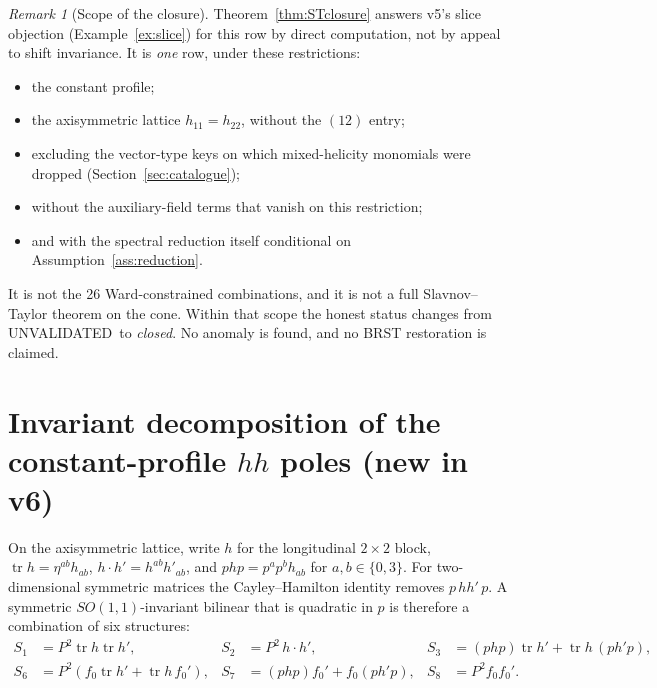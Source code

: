 \documentclass[11pt,a4paper]{article}
\newcommand{\UNVALIDATED}{\textsf{UNVALIDATED}}
\theoremstyle{plain}
\theoremstyle{definition}
\theoremstyle{remark}
\newtheorem{remark}[theorem]{Remark}
\numberwithin{equation}{section}
\begin{document}
\begin{remark}[Scope of the closure]
\label{rem:STscope}
Theorem~\ref{thm:STclosure} answers v5's slice objection
(Example~\ref{ex:slice}) for this row by direct computation, not
by appeal to shift invariance.
It is \emph{one} row, under these restrictions:
\begin{itemize}
\item the constant profile;
\item the axisymmetric lattice \(h_{11}=h_{22}\), without the
\((12)\) entry;
\item excluding the vector-type keys on which mixed-helicity
monomials were dropped (Section~\ref{sec:catalogue});
\item without the auxiliary-field terms that vanish on this
restriction;
\item and with the spectral reduction itself conditional on
Assumption~\ref{ass:reduction}.
\end{itemize}
It is not the 26 Ward-constrained combinations, and it is not a
full Slavnov--Taylor theorem on the cone.
Within that scope the honest status changes from \UNVALIDATED\
to \emph{closed}.
No anomaly is found, and no BRST restoration is claimed.
\end{remark}

\section{Invariant decomposition of the constant-profile \texorpdfstring{\(hh\)}{hh} poles (new in v6)}
\label{sec:structures}

On the axisymmetric lattice, write \(h\) for the longitudinal
\(2\times2\) block, \(\operatorname{tr}h=\eta^{ab}h_{ab}\),
\(h\cdot h'=h^{ab}h'_{ab}\), and
\(php=p^ap^bh_{ab}\) for \(a,b\in\{0,3\}\).
For two-dimensional symmetric matrices the Cayley--Hamilton
identity removes \(p\,hh'\,p\).
A symmetric \(SO(1,1)\)-invariant bilinear that is quadratic in
\(p\) is therefore a combination of six structures:
\begin{align*}
S_1&=P^2\operatorname{tr}h\operatorname{tr}h', &
S_2&=P^2\,h\cdot h', &
S_3&=(php)\operatorname{tr}h'+\operatorname{tr}h\,(ph'p),\\
S_6&=P^2(f_0\operatorname{tr}h'+\operatorname{tr}h\,f_0'), &
S_7&=(php)f_0'+f_0(ph'p), &
S_8&=P^2f_0f_0'.
\end{align*}
\end{document}
